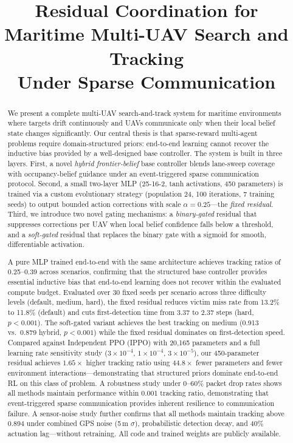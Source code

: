 \documentclass[journal]{IEEEtran}
\title{Residual Coordination for Maritime Multi-UAV Search and Tracking\\
Under Sparse Communication}
\author{
\IEEEauthorblockN{Satish Kumar Mishra\textsuperscript{1}*,
Rashmi Gupta\textsuperscript{1}, and Ashfaq Khan\textsuperscript{1}}
\IEEEauthorblockA{\textsuperscript{1}Department of Electronics and Communication Engineering,\\
Netaji Subhas University of Technology, New Delhi 110078, India\\
*Corresponding author. Email: satishmishra135799@nsut.ac.in}
}
\begin{document}
\maketitle

\begin{abstract}
We present a complete multi-UAV search-and-track system for maritime environments
where targets drift continuously and UAVs communicate only when their local belief
state changes significantly. Our central thesis is that sparse-reward multi-agent
problems require domain-structured priors: end-to-end learning cannot recover the
inductive bias provided by a well-designed base controller. The system is built in
three layers. First, a novel \emph{hybrid frontier-belief} base controller blends
lane-sweep coverage with occupancy-belief guidance under an event-triggered sparse
communication protocol. Second, a small two-layer MLP (25-16-2, tanh activations,
450 parameters) is trained via a custom evolutionary strategy (population 24, 100
iterations, 7 training seeds) to output bounded action corrections with scale
$\alpha = 0.25$---the \emph{fixed residual}. Third, we introduce two novel gating
mechanisms: a \emph{binary-gated} residual that suppresses corrections per UAV when
local belief confidence falls below a threshold, and a \emph{soft-gated} residual
that replaces the binary gate with a sigmoid for smooth, differentiable activation.

A pure MLP trained end-to-end with the same architecture achieves tracking ratios of
0.25--0.39 across scenarios, confirming that the structured base controller provides
essential inductive bias that end-to-end learning does not recover within the
evaluated compute budget. Evaluated over
30 fixed seeds per scenario across three difficulty levels (default, medium, hard),
the fixed residual reduces victim miss rate from 13.2\% to 11.8\% (default) and cuts
first-detection time from 3.37 to 2.37 steps (hard, $p < 0.001$). The soft-gated
variant achieves the best tracking on medium (0.913 vs.\ 0.879 hybrid, $p < 0.001$)
while the fixed residual dominates on first-detection speed. Compared against
Independent PPO (IPPO) with 20,165 parameters and a full learning rate sensitivity
study ($3\times10^{-4}$, $1\times10^{-4}$, $3\times10^{-5}$), our 450-parameter
residual achieves $1.65\times$ higher tracking ratio using $44.8\times$ fewer
parameters and fewer environment interactions---demonstrating that structured priors
dominate end-to-end RL on this class of problem. A robustness study under 0--60\%
packet drop rates shows all methods maintain performance within 0.001 tracking ratio,
demonstrating that event-triggered sparse communication provides inherent resilience
to communication failure. A sensor-noise study further confirms that all methods
maintain tracking above 0.894 under combined GPS noise (5\,m $\sigma$), probabilistic
detection decay, and 40\% actuation lag---without retraining. All code and trained
weights are publicly available.
\end{abstract}
\end{document}
